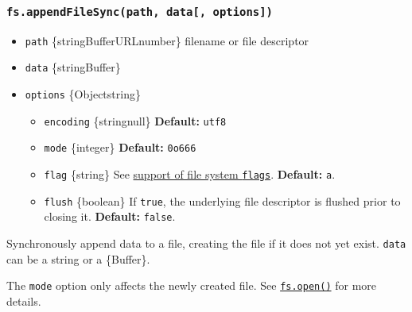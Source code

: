 \subsubsection{\texorpdfstring{\texttt{fs.appendFileSync(path,\ data{[},\ options{]})}}{fs.appendFileSync(path, data{[}, options{]})}}\label{fs.appendfilesyncpath-data-options}

\begin{itemize}
\tightlist
\item
  \texttt{path} \{string\textbar Buffer\textbar URL\textbar number\}
  filename or file descriptor
\item
  \texttt{data} \{string\textbar Buffer\}
\item
  \texttt{options} \{Object\textbar string\}

  \begin{itemize}
  \tightlist
  \item
    \texttt{encoding} \{string\textbar null\} \textbf{Default:}
    \texttt{\textquotesingle{}utf8\textquotesingle{}}
  \item
    \texttt{mode} \{integer\} \textbf{Default:} \texttt{0o666}
  \item
    \texttt{flag} \{string\} See \hyperref[file-system-flags]{support of
    file system \texttt{flags}}. \textbf{Default:}
    \texttt{\textquotesingle{}a\textquotesingle{}}.
  \item
    \texttt{flush} \{boolean\} If \texttt{true}, the underlying file
    descriptor is flushed prior to closing it. \textbf{Default:}
    \texttt{false}.
  \end{itemize}
\end{itemize}

Synchronously append data to a file, creating the file if it does not
yet exist. \texttt{data} can be a string or a \{Buffer\}.

The \texttt{mode} option only affects the newly created file. See
\hyperref[fsopenpath-flags-mode-callback]{\texttt{fs.open()}} for more
details.

\begin{Shaded}
\begin{Highlighting}[]
 \OperatorTok{;}

\NormalTok{ \{}
  \NormalTok{(}\OperatorTok{,} \NormalTok{)}\OperatorTok{;}
  \NormalTok{(}\NormalTok{)}\OperatorTok{;}
\NormalTok{\} }
\NormalTok{\}}
\end{Highlighting}
\end{Shaded}

